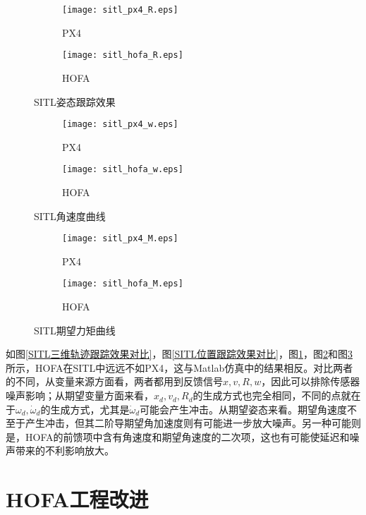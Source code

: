 \begin{figure}[H]
  \centering
\begin{subfigure}[b]{0.49\linewidth}
    \texttt{[image: sitl\_px4\_R.eps]}
    \caption{PX4}
\end{subfigure}
\hfill
\begin{subfigure}[b]{0.49\linewidth}
    \texttt{[image: sitl\_hofa\_R.eps]}
    \caption{HOFA}
\end{subfigure}
\caption{SITL姿态跟踪效果}
\label{SITL姿态跟踪效果}
\end{figure}

\begin{figure}[H]
  \centering
\begin{subfigure}[b]{0.49\linewidth}
    \texttt{[image: sitl\_px4\_w.eps]}
    \caption{PX4}
\end{subfigure}
\hfill
\begin{subfigure}[b]{0.49\linewidth}
    \texttt{[image: sitl\_hofa\_w.eps]}
    \caption{HOFA}
\end{subfigure}
\caption{SITL角速度曲线}
\label{SITL角速度曲线}
\end{figure}


\begin{figure}[H]
  \centering
\begin{subfigure}[b]{0.49\linewidth}
    \texttt{[image: sitl\_px4\_M.eps]}
    \caption{PX4}
\end{subfigure}
\hfill
\begin{subfigure}[b]{0.49\linewidth}
    \texttt{[image: sitl\_hofa\_M.eps]}
    \caption{HOFA}
\end{subfigure}
\caption{SITL期望力矩曲线}
\label{SITL期望力矩曲线}
\end{figure}

如图\ref{SITL三维轨迹跟踪效果对比}，图\ref{SITL位置跟踪效果对比}，图\ref{SITL姿态跟踪效果}，图\ref{SITL角速度曲线}和图\ref{SITL期望力矩曲线}所示，HOFA在SITL中远远不如PX4，这与Matlab仿真中的结果相反。对比两者的不同，从变量来源方面看，两者都用到反馈信号$x,v,R,w$，因此可以排除传感器噪声影响；从期望变量方面来看，$x_d,v_d,R_d$的生成方式也完全相同，不同的点就在于$\omega_d,\dot \omega_d$的生成方式，尤其是$\dot \omega_d$可能会产生冲击。从期望姿态来看。期望角速度不至于产生冲击，但其二阶导期望角加速度则有可能进一步放大噪声。另一种可能则是，HOFA的前馈项中含有角速度和期望角速度的二次项，这也有可能使延迟和噪声带来的不利影响放大。

\section{HOFA工程改进}

